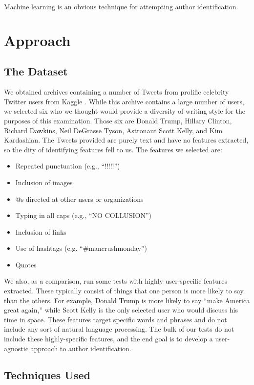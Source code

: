 \documentclass[letter,11pt,titlepage]{article}
\begin{document}
Machine learning is an obvious technique for attempting author identification. 

\section{Approach}

\subsection{The Dataset}

We obtained archives containing a number of Tweets from prolific celebrity Twitter users from Kaggle \cite{TweetSource}. While this archive contains a large number of users, we selected six who we thought would provide a diversity of writing style for the purposes of this examination. Those six are Donald Trump, Hillary Clinton, Richard Dawkins, Neil DeGrasse Tyson, Astronaut Scott Kelly, and Kim Kardashian. The Tweets provided are purely text and have no features extracted, so the dity of identifying features fell to us. The features we selected are:

\begin{itemize}
    \item Repeated punctuation (e.g., ``!!!!!'')
    \item Inclusion of images
    \item @s directed at other users or organizations
    \item Typing in all caps (e.g., ``NO COLLUSION'')
    \item Inclusion of links
    \item Use of hashtags (e.g. ``\#mancrushmonday'')
    \item Quotes
\end{itemize}

We also, as a comparison, run some tests with highly user-specific features extracted. These typically consist of things that one person is more likely to say than the others. For example, Donald Trump is more likely to say ``make America great again,'' while Scott Kelly is the only selected user who would discuss his time in space. These features target specific words and phrases and do not include any sort of natural language processing. The bulk of our tests do not include these highly-specific features, and the end goal is to develop a user-agnostic approach to author identification.

\subsection{Techniques Used}
\end{document}
